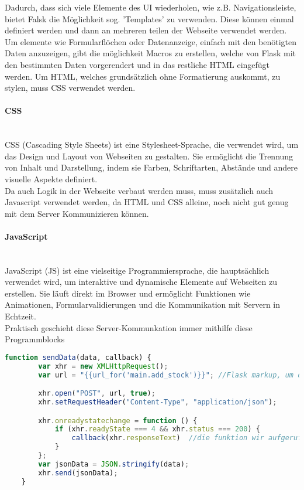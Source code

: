 Dadurch, dass sich viele Elemente des UI wiederholen, wie z.B. Navigationsleiste, bietet Falsk die Möglichkeit sog. 'Templates' zu verwenden. Diese können einmal definiert werden und dann an mehreren teilen der Webseite verwendet werden.
Um elemente wie Formularflöchen oder Datenanzeige, einfach mit den benötigten Daten anzuzeigen, gibt die möglichkeit Macros zu erstellen, welche von Flask mit den bestimmten Daten vorgerendert und in das restliche HTML eingefügt werden.
Um HTML, welches grundsätzlich ohne Formatierung auskommt, zu stylen, muss CSS verwendet werden. 

\paragraph{CSS}\mbox{}\\
CSS (Cascading Style Sheets) ist eine Stylesheet-Sprache, die verwendet wird, um das Design und Layout von Webseiten zu gestalten. Sie ermöglicht die Trennung von Inhalt und Darstellung, indem sie Farben, Schriftarten, Abstände und andere visuelle Aspekte definiert.\cite{chatgpt}\\

Da auch Logik in der Webseite verbaut werden muss, muss zusätzlich auch Javascript verwendet werden, da HTML und CSS alleine, noch nicht gut genug mit dem Server Kommunizieren können.

\paragraph{JavaScript}\mbox{}\\
JavaScript (JS) ist eine vielseitige Programmiersprache, die hauptsächlich verwendet wird, um interaktive und dynamische Elemente auf Webseiten zu erstellen. Sie läuft direkt im Browser und ermöglicht Funktionen wie Animationen, Formularvalidierungen und die Kommunikation mit Servern in Echtzeit.\cite{chatgpt}\\

Praktisch geschieht diese Server-Kommunkation immer mithilfe diese Programmblocks

\begin{lstlisting}[language=JavaScript]
    function sendData(data, callback) {
        var xhr = new XMLHttpRequest();
        var url = "{{url_for('main.add_stock')}}"; //Flask markup, um die richtige url zu erreichen, dies wird vor ausgabe auf der Webseite noch eingesetzt

        xhr.open("POST", url, true);
        xhr.setRequestHeader("Content-Type", "application/json");

        xhr.onreadystatechange = function () {
            if (xhr.readyState === 4 && xhr.status === 200) {
                callback(xhr.responseText)  //die funktion wir aufgerufen
            }
        };
        var jsonData = JSON.stringify(data);
        xhr.send(jsonData);
    }
\end{lstlisting}

